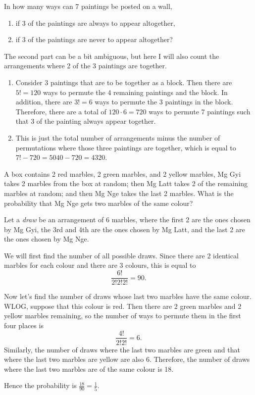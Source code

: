 \begin{question}
    In how many ways can 7 paintings be posted on a wall,
    \begin{enumerate}
        \item if 3 of the paintings are always to appear altogether,
        
        \item if 3 of the paintings are never to appear altogether?
    \end{enumerate}
\end{question}
\begin{solution}
    The second part can be a bit ambiguous, but here I will also count the
    arrangements where 2 of the 3 paintings are together. 
    \begin{enumerate}
        \item Consider 3 paintings that are to be together as a block. Then
            there are $5! = 120$ ways to permute the 4 remaining paintings and the
            block. In addition, there are $3! = 6$ ways to permute the 3
            paintings in the block. Therefore, there are a total of $120 \cdot
            6 = 720$ ways to permute 7 paintings such that 3 of the painting
            always appear together.

        \item This is just the total number of arrangements minus the number of
            permutations where those three paintings are together, which is
            equal to $7! - 720 = 5040 - 720 = 4320$. \qedhere
    \end{enumerate}
\end{solution}

\begin{question}
    A box contains 2 red marbles, 2 green marbles, and 2 yellow marbles, Mg Gyi
    takes 2 marbles from the box at random; then Mg Latt takes 2 of the
    remaining marbles at random; and then Mg Nge takes the last 2 marbles. What
    is the probability that Mg Nge gets two marbles of the same colour?
\end{question}
\begin{solution}
    Let a \emph{draw} be an arrangement of 6 marbles, where the first 2 are the
    ones chosen by Mg Gyi, the 3rd and 4th are the ones chosen by Mg Latt, and
    the last 2 are the ones chosen by Mg Nge. 

    We will first find the number of all possible draws. Since there are 2
    identical marbles for each colour and there are 3 colours, this is equal to
    \[ \frac{6!}{2!2!2!} = 90. \]

    Now let's find the number of draws whose last two marbles have the same
    colour. WLOG, suppose that this colour is red. Then there are 2 green
    marbles and 2 yellow marbles remaining, so the number of ways to permute
    them in the first four places is
    \[ \frac{4!}{2!2!} = 6. \]
    Similarly, the number of draws where the last two marbles are green and
    that where the last two marbles are yellow are also 6. Therefore, the
    number of draws where the last two marbles are of the same colour is 18.

    Hence the probability is $\frac{18}{90} = \frac{1}{5}$.
\end{solution}

